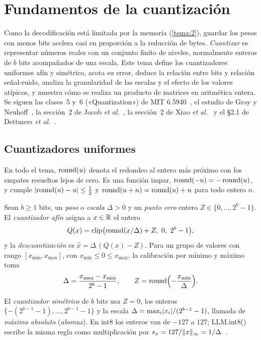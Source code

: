 \chapter{Fundamentos de la cuantización}
\label{tema:4}

Como la decodificación está limitada por la memoria (\cref{tema:2}), guardar los pesos con menos bits acelera casi en proporción a la reducción de bytes. \emph{Cuantizar} es representar números reales con un conjunto finito de niveles, normalmente enteros de $b$ bits acompañados de una escala. Este tema define los cuantizadores uniformes afín y simétrico, acota su error, deduce la relación entre bits y relación señal-ruido, analiza la granularidad de las escalas y el efecto de los valores atípicos, y muestra cómo se realiza un producto de matrices en aritmética entera. Se siguen las clases~5 y~6 («Quantization») de MIT 6.5940~\cite{mit65940}, el estudio de Gray y Neuhoff~\cite{grayneuhoff}, la sección~2 de Jacob \emph{et al.}~\cite{jacob}, la sección~2 de Xiao \emph{et al.}~\cite{smoothquant} y el §2.1 de Dettmers \emph{et al.}~\cite{llmint8}.

\section{Cuantizadores uniformes}

En todo el tema, $\operatorname{round}(u)$ denota el redondeo al entero más próximo con los empates resueltos lejos de cero. Es una función impar, $\operatorname{round}(-u)=-\operatorname{round}(u)$, y cumple $\lvert\operatorname{round}(u)-u\rvert\le\frac12$ y $\operatorname{round}(u+n)=\operatorname{round}(u)+n$ para todo entero $n$.

\begin{definicion}\label{def:afin}
Sean $b\ge 1$ bits, un \emph{paso} o \emph{escala} $\Delta>0$ y un \emph{punto cero} entero $Z\in\{0,\dots,2^{b}-1\}$. El \emph{cuantizador afín} asigna a $x\in\mathbb{R}$ el entero
\[
Q(x)=\clip\bigl(\rnd(x/\Delta)+Z,\ 0,\ 2^{b}-1\bigr),
\]
y la \emph{descuantización} es $\hat x=\Delta\,(Q(x)-Z)$. Para un grupo de valores con rango $[x_{\min},x_{\max}]$, con $x_{\min}\le 0\le x_{\max}$, la calibración por mínimo y máximo toma
\[
\Delta=\frac{x_{\max}-x_{\min}}{2^{b}-1},\qquad Z=\operatorname{round}\Bigl(-\frac{x_{\min}}{\Delta}\Bigr).
\]
\end{definicion}

\begin{definicion}\label{def:simetrico}
El \emph{cuantizador simétrico} de $b$ bits usa $Z=0$, los enteros $\{-(2^{b-1}-1),\dots,2^{b-1}-1\}$ y la escala $\Delta=\max_i\lvert x_i\rvert/(2^{b-1}-1)$, llamada de \emph{máximo absoluto} (\emph{absmax}). En int8 los enteros van de $-127$ a $127$; LLM.int8() escribe la misma regla como multiplicación por $s_x=127/\lVert x\rVert_\infty=1/\Delta$~\cite[§2.1]{llmint8}.
\end{definicion}

